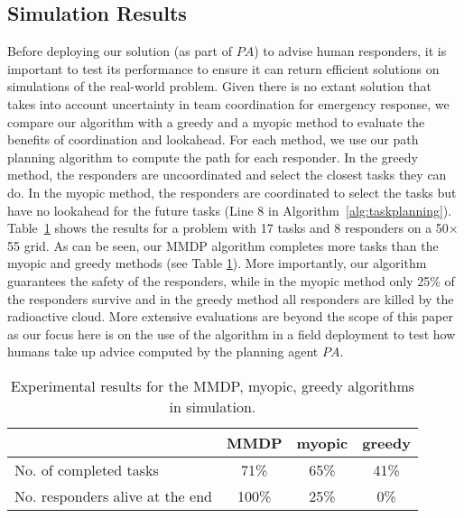 \subsection{Simulation Results}



\noindent Before deploying our solution (as part of $PA$) to advise
human responders, it is important  to test its performance to
ensure it can return efficient solutions on simulations of the
real-world problem. Given there is no extant solution that
takes into account uncertainty in team coordination for emergency
response, we compare our algorithm with a greedy and a
myopic method to evaluate the benefits of coordination and
lookahead. For each method, we use our path planning algorithm to
compute the path for each responder. In the greedy method, the responders
are uncoordinated and select the closest tasks they can do. In
the myopic method, the responders are coordinated to select the
tasks but have no lookahead for the future tasks (Line 8 in
Algorithm~\ref{alg:taskplanning}). Table~\ref{tab:simulation} shows
the results for a problem with 17 tasks and 8 responders on a
50$\times$55 grid. As can be seen, our MMDP algorithm 
completes more tasks than the myopic and greedy methods (see Table
\ref{tab:simulation}). More importantly, our algorithm guarantees
the safety of the responders, while in the myopic method  only 25\%
of the responders survive and in the greedy method all responders
are killed by the radioactive cloud. More extensive evaluations are
beyond the scope of this paper as our focus here is on the use of
the algorithm in a field deployment to test how humans take up
advice computed by the planning agent $PA$.
\begin{table}[htbp]
  \centering
  \caption{Experimental results for the MMDP, myopic, greedy
  algorithms in simulation.}
  \begin{tabular}{l|c|c|c}
   & MMDP & myopic & greedy \\
  \hline
  No. of completed tasks & 71\% & 65\% & 41\% \\
  \hline
  No. responders alive at the end & 100\% & 25\% & 0\% \\
  \end{tabular}
  \label{tab:simulation}\vspace{-3mm}
\end{table}

